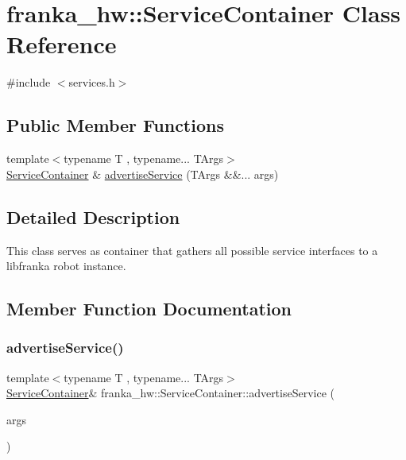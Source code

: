\hypertarget{classfranka__hw_1_1_service_container}{}\section{franka\+\_\+hw\+:\+:Service\+Container Class Reference}
\label{classfranka__hw_1_1_service_container}


{\ttfamily \#include $<$services.\+h$>$}

\subsection*{Public Member Functions}
\begin{DoxyCompactItemize}
\item 
{\footnotesize template$<$typename T , typename... T\+Args$>$ }\\\hyperlink{classfranka__hw_1_1_service_container}{Service\+Container} \& \hyperlink{classfranka__hw_1_1_service_container_a5fbb4d3dda5328b92d92aa85fb6fae09}{advertise\+Service} (T\+Args \&\&... args)
\end{DoxyCompactItemize}


\subsection{Detailed Description}
This class serves as container that gathers all possible service interfaces to a libfranka robot instance. 

\subsection{Member Function Documentation}
\mbox{\label{classfranka__hw_1_1_service_container_a5fbb4d3dda5328b92d92aa85fb6fae09}} 
\subsubsection{\texorpdfstring{advertise\+Service()}{advertiseService()}}
{\footnotesize\ttfamily template$<$typename T , typename... T\+Args$>$ \\
\hyperlink{classfranka__hw_1_1_service_container}{Service\+Container}\& franka\+\_\+hw\+::\+Service\+Container\+::advertise\+Service (\begin{DoxyParamCaption}\item[{T\+Args \&\&...}]{args }\end{DoxyParamCaption})\hspace{0.3cm}{\ttfamily [inline]}}

